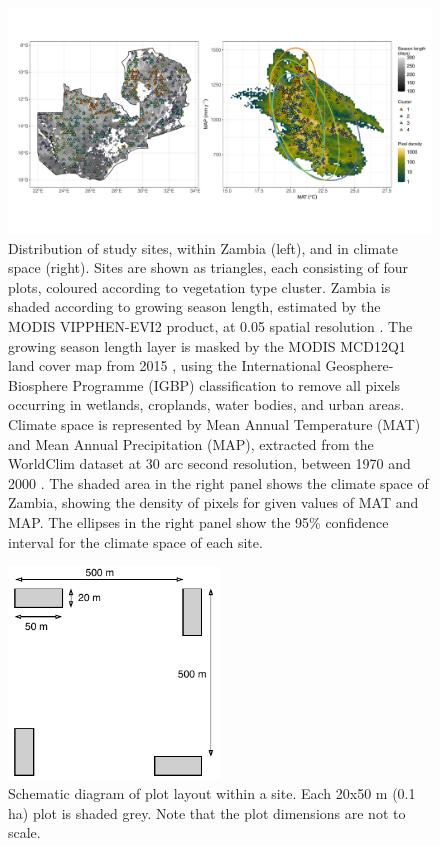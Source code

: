 \begin{refsection}
\begin{figure}[tb]
\centering
	\includegraphics[width=\textwidth]{img/plot_loc_clim}
	\caption[Map of study sites in Zambia]{Distribution of study sites, within Zambia (left), and in climate space (right). Sites are shown as triangles, each consisting of four plots, coloured according to vegetation type cluster. Zambia is shaded according to growing season length, estimated by the MODIS VIPPHEN-EVI2 product, at 0.05\textdegree{} spatial resolution \citep{VIPPHEN}. The growing season length layer is masked by the MODIS MCD12Q1 land cover map from 2015 \citep{MCD12Q1}, using the International Geosphere-Biosphere Programme (IGBP) classification to remove all pixels occurring in wetlands, croplands, water bodies, and urban areas. Climate space is represented by Mean Annual Temperature (MAT) and Mean Annual Precipitation (MAP), extracted from the WorldClim dataset at 30 arc second resolution, between 1970 and 2000 \citep{Fick2017}. The shaded area in the right panel shows the climate space of Zambia, showing the density of pixels for given values of MAT and MAP. The ellipses in the right panel show the 95\% confidence interval for the climate space of each site.} 
	\label{phen:plot_loc_clim}
\end{figure}

\begin{landscape}

\end{landscape}

\begin{figure}[tb]
\centering
	\includegraphics[width=0.5\textwidth]{img/schematic}
	\caption[Schematic diagram of plot layout within a site]{Schematic diagram of plot layout within a site. Each 20x50 m (0.1 ha) plot is shaded grey. Note that the plot dimensions are not to scale.}
	\label{phen:schematic}
\end{figure}


\end{refsection}
